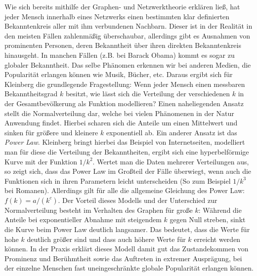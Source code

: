 Wie sich bereits mithilfe der Graphen- und Netzwerktheorie erklären ließ, hat jeder Mensch innerhalb eines Netzwerks einen bestimmten klar definierten Bekanntenkreis aller mit ihm verbundenen Nachbarn.
Dieser ist in der Realität in den meisten Fällen zahlenmäßig überschaubar, allerdings gibt es Ausnahmen von prominenten Personen, deren Bekanntheit über ihren direkten Bekanntenkreis hinausgeht.
In manchen Fällen (z.B. bei Barack Obama) kommt es sogar zu globaler Bekanntheit.
Das selbe Phänomen erkennen wir bei anderen Medien, die Popularität erlangen können wie Musik, Bücher, etc.
Daraus ergibt sich für Kleinberg die grundlegende Fragestellung:
Wenn jeder Mensch einen messbaren Bekanntheitsgrad $k$ besitzt, wie lässt sich die Verteilung der verschiedenen $k$ in der Gesamtbevölkerung als Funktion modellieren?
Einen naheliegenden Ansatz stellt die Normalverteilung dar, welche bei vielen Phänomenen in der Natur Anwendung findet.
Hierbei scharen sich die Anteile um einen Mittelwert und sinken für größere und kleinere $k$ exponentiell ab.
Ein anderer Ansatz ist das \emph{Power Law}.
Kleinberg bringt hierbei das Beispiel von Internetseiten, modelliert man für diese die Verteilung der Bekanntheiten, ergibt sich eine hyperbelförmige Kurve mit der Funktion $1/ k^2 $.
Wertet man die Daten mehrerer Verteilungen aus, so zeigt sich, dass das Power Law im Großteil der Fälle überwiegt, wenn auch die Funktionen sich in ihren Parametern leicht unterscheiden (So zum Beispiel $1/ k^3$ bei Romanen).
Allerdings gilt für alle die allgemeine Gleichung des Power Law:
$f(k) = a/(k^c)$.
Der Vorteil dieses Modells und der Unterschied zur Normalverteilung besteht im Verhalten des Graphen für große $k$:
Während die Anteile bei exponentieller Abnahme mit steigendem $k$ gegen Null streben, sinkt die Kurve beim Power Law deutlich langsamer.
Das bedeutet, dass die Werte für hohe $k$ deutlich größer sind und dass auch höhere Werte für $k$ erreicht werden können.
In der Praxis erklärt dieses Modell damit gut das Zustandekommen von Prominenz und Berühmtheit sowie das Auftreten in extremer Ausprägung, bei der einzelne Menschen fast uneingeschränkte globale Popularität erlangen können.
